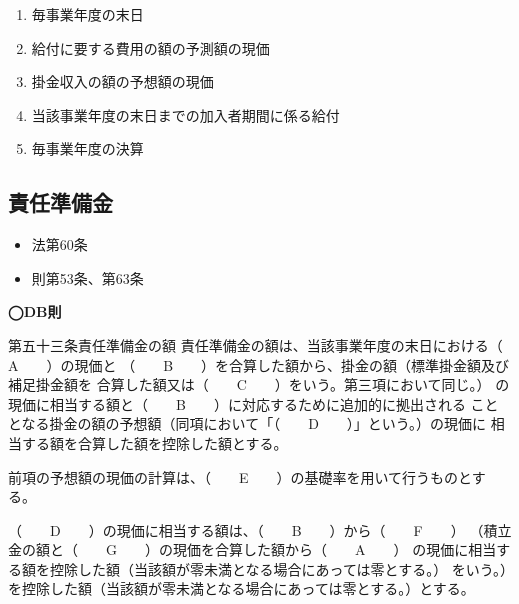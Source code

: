 \begin{answerbox}
  \begin{enumerate}[A: ]
    \item 毎事業年度の末日
    \item 給付に要する費用の額の予測額の現価
    \item 掛金収入の額の予想額の現価
    \item 当該事業年度の末日までの加入者期間に係る給付
    \item 毎事業年度の決算
  \end{enumerate}
\end{answerbox}

\newpage

\subsection{責任準備金}

\begin{InyouJobunbox}
  \begin{itemize}
    \item 法第60条
    \item 則第53条、第63条
  \end{itemize}
\end{InyouJobunbox}

\begin{fillblank}[数理人試験 H29 問題1 設問1]
  \noindent \textbf{◯DB則}
  \begin{lawstructure}
    \begin{lawarticle}{第五十三条}{責任準備金の額}
      責任準備金の額は、当該事業年度の末日における（　　A　　）の現価と
      （　　B　　）を合算した額から、掛金の額（標準掛金額及び補足掛金額を
      合算した額又は（　　C　　）をいう。第三項において同じ。）
      の現価に相当する額と（　　B　　）に対応するために追加的に拠出される
      こととなる掛金の額の予想額（同項において「（　　D　　）」という。）の現価に
      相当する額を合算した額を控除した額とする。
    
      前項の予想額の現価の計算は、（　　E　　）の基礎率を用いて行うものとする。

      （　　D　　）の現価に相当する額は、（　　B　　）から（　　F　　）
      （積立金の額と（　　G　　）の現価を合算した額から（　　A　　）
      の現価に相当する額を控除した額（当該額が零未満となる場合にあっては零とする。）
      をいう。）を控除した額（当該額が零未満となる場合にあっては零とする。）とする。
    \end{lawarticle}
  \end{lawstructure}
\end{fillblank}

